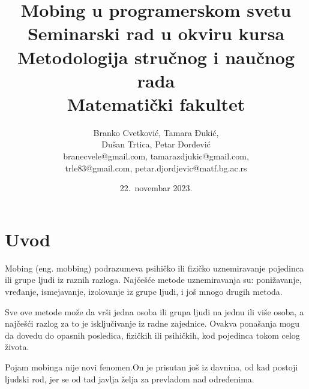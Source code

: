 \documentclass[a4paper]{article}
\begin{document}
    \title{Mobing u programerskom svetu\\ \small{Seminarski rad u okviru kursa\\Metodologija stručnog i naučnog rada\\ Matematički fakultet}}

    \author{Branko Cvetković, Tamara Đukić,\\Dušan Trtica, Petar Đorđević\\branecvele@gmail.com, tamarazdjukic@gmail.com,\\trle83@gmail.com, petar.djordjevic@matf.bg.ac.rs}

    \date{22.~novembar 2023.}

    \maketitle


    \tableofcontents
    
    \newpage
    \section{Uvod}
        Mobing (eng. mobbing) podrazumeva psihičko ili fizičko uznemiravanje pojedinca ili grupe ljudi iz raznih razloga. Najčešće metode uznemiravanja su: ponižavanje, vređanje, ismejavanje, izolovanje iz grupe ljudi, i još mnogo drugih metoda.
        
        Sve ove metode može da vrši jedna osoba ili grupa ljudi na jednu ili više osoba, a najčešći razlog za to je isključivanje iz radne zajednice. Ovakva ponašanja mogu da dovedu do opasnih posledica, fizičkih ili psihičkih, kod pojedinca tokom celog života.
        
        Pojam mobinga nije novi fenomen.\hspace{0.1cm}On je prisutan još iz davnina, od kad postoji ljudski rod, jer se od tad javlja želja za prevladom nad određenima.
        
\end{document}
